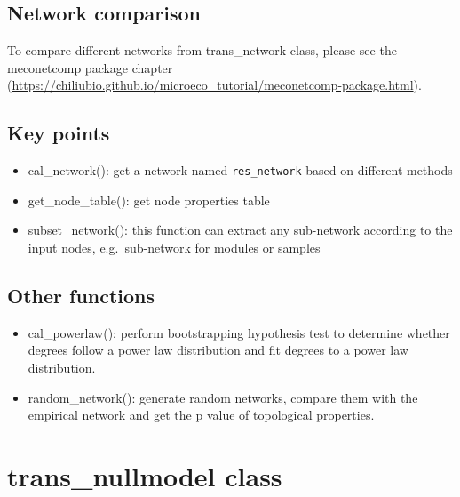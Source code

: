 \documentclass[
]{book}
\providecommand{\tightlist}{%
  \setlength{\itemsep}{0pt}\setlength{\parskip}{0pt}}
\begin{document}
\subsection{Network comparison}\label{network-comparison}

To compare different networks from trans\_network class,
please see the meconetcomp package chapter (\url{https://chiliubio.github.io/microeco_tutorial/meconetcomp-package.html}).

\subsection{Key points}\label{key-points-7}

\begin{itemize}
\tightlist
\item
  cal\_network(): get a network named \texttt{res\_network} based on different methods
\item
  get\_node\_table(): get node properties table
\item
  subset\_network(): this function can extract any sub-network according to the input nodes, e.g.~sub-network for modules or samples
\end{itemize}

\subsection{Other functions}\label{other-functions}

\begin{itemize}
\tightlist
\item
  cal\_powerlaw(): perform bootstrapping hypothesis test to determine whether degrees follow a power law distribution and fit degrees to a power law distribution.\\
\item
  random\_network(): generate random networks, compare them with the empirical network and get the p value of topological properties.
\end{itemize}

\section{trans\_nullmodel class}\label{trans_nullmodel-class}
\end{document}
